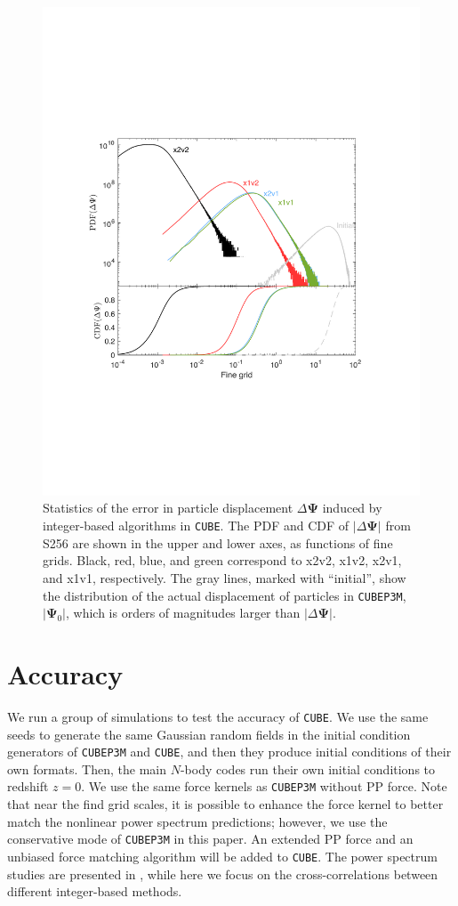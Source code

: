 \documentclass[10pt,twocolumn,reprint]{emulateapj}
\newcommand{\bs}{\boldsymbol}
\begin{document}
\begin{figure}[]
\centering
  \includegraphics[width=0.99\linewidth]{f8}
 \caption{Statistics of the error in particle displacement $\Delta{\bs\Psi}$ induced by integer-based algorithms in {\tt CUBE}. The PDF and CDF of $|\Delta{\bs\Psi}|$ from S256 are shown in the upper and lower axes, as functions of fine grids. Black, red, blue, and green correspond to x2v2, x1v2, x2v1, and x1v1, respectively. The gray lines, marked with ``initial'', show the distribution of the actual displacement of particles in {\tt CUBEP3M}, $|{\bs\Psi}_0|$, which is orders of magnitudes larger than $|\Delta{\bs\Psi}|$. }
\label{fig.dsp}
\end{figure}

\section{Accuracy}\label{s.results}
We run a group of simulations to test the accuracy of {\tt CUBE}. We use the same seeds to generate the same Gaussian random fields in the initial condition generators of {\tt CUBEP3M} and {\tt CUBE}, and then they produce initial conditions of their own formats. Then, the main $N$-body codes run their own initial conditions to redshift $z=0$. We use the same force kernels as {\tt CUBEP3M} without PP force. Note that near the find grid scales, it is possible to enhance the force kernel to better match the nonlinear power spectrum predictions; however, we use the conservative mode of {\tt CUBEP3M} in this paper. An extended PP force and an unbiased force matching algorithm will be added to {\tt CUBE}. The power spectrum studies are presented in \citet{2013MNRAS.436..540H}, while here we focus on the cross-correlations between different integer-based methods.
\end{document}
